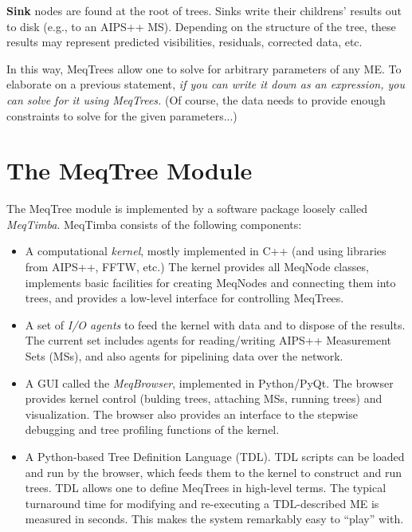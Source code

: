 \documentclass[11pt,twoside]{article}  %
\begin{document}
{\bf Sink} nodes are found at the root of trees. Sinks write their
childrens' results out to disk (e.g., to an AIPS++ MS). Depending
on the structure of the tree, these results may represent predicted
visibilities, residuals, corrected data, etc.

In this way, MeqTrees allow one to solve for arbitrary parameters of any ME. To
elaborate on a previous statement, {\em if you can write it down as an
expression, you can solve for it using MeqTrees.} (Of course, the data needs to
provide enough constraints to solve for the given parameters...)

\section{The MeqTree Module}

The MeqTree module is implemented by a software package loosely called {\em
MeqTimba}. MeqTimba consists of the following components:

\begin{itemize}

\item A computational {\em kernel}, mostly implemented in C++ (and using
libraries from AIPS++, FFTW, etc.) The kernel provides all MeqNode classes,
implements basic facilities for creating MeqNodes and connecting them into
trees, and provides a low-level interface for controlling MeqTrees. 

\item A set of {\em I/O agents} to feed the kernel with data and to dispose of
the results. The current set includes agents for reading/writing AIPS++
Measurement Sets (MSs), and also agents for pipelining data over the network.

\item A GUI called the {\em MeqBrowser}, implemented in Python/PyQt.
The browser provides kernel control (bulding trees, attaching MSs, running
trees) and visualization. The browser also provides an interface to the 
stepwise debugging and tree profiling functions of the kernel.

\item A Python-based Tree Definition Language (TDL). TDL scripts can be loaded
and run by the browser, which feeds them to the kernel to construct and run
trees. TDL allows one to define MeqTrees in high-level terms. The typical
turnaround time for modifying and re-executing a TDL-described ME is measured in
seconds. This makes the system remarkably easy to ``play'' with. 

\end{itemize}
\end{document}
